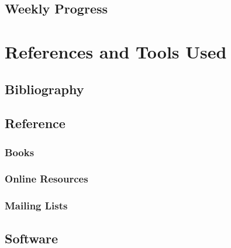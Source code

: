 \documentclass[a4paper,12pt]{report}
\begin{document}
\section{Weekly Progress}


\chapter{References and Tools Used}

\section{Bibliography}

\section{Reference}

%

\subsection{Books}



\subsection{Online Resources}



\subsection{Mailing Lists}

%

\section{Software}


\end{document}
